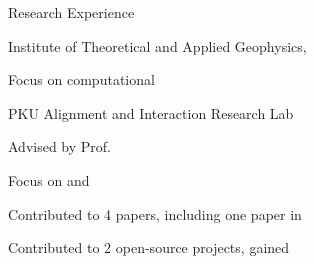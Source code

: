\begin{rubric}{Research Experience}


  \listitem{} Institute of Theoretical and Applied Geophysics,

  \listitem{} Focus on computational 


  \listitem{} PKU Alignment and Interaction Research Lab

  \listitem{} Advised by
  Prof.~\href{https://www.yangyaodong.com}{}

  \listitem{} Focus on  and 

  \listitem{} Contributed to 4 papers, including one  paper in 

  \listitem{} Contributed to 2 open-source projects, gained 
\end{rubric}
